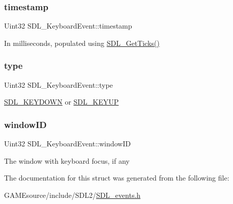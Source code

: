 \subsubsection{\texorpdfstring{timestamp}{timestamp}}
{\footnotesize\ttfamily Uint32 S\+D\+L\+\_\+\+Keyboard\+Event\+::timestamp}

In milliseconds, populated using \mbox{\hyperlink{_s_d_l__timer_8h_a0b9bc71d6287e0ffafdc3419760fe2b3}{S\+D\+L\+\_\+\+Get\+Ticks()}} \mbox{\label{struct_s_d_l___keyboard_event_ae0b2f2aace6f80c1f47e5a14350d409a}} 
\subsubsection{\texorpdfstring{type}{type}}
{\footnotesize\ttfamily Uint32 S\+D\+L\+\_\+\+Keyboard\+Event\+::type}

\mbox{\hyperlink{_s_d_l__events_8h_a3b589e89be6b35c02e0dd34a55f3fccaacaf8cfd53c985cdbf6a90c811d51a1fc}{S\+D\+L\+\_\+\+K\+E\+Y\+D\+O\+WN}} or \mbox{\hyperlink{_s_d_l__events_8h_a3b589e89be6b35c02e0dd34a55f3fccaadefb8866b9d28be21c2c33c35cc66c4b}{S\+D\+L\+\_\+\+K\+E\+Y\+UP}} \mbox{\label{struct_s_d_l___keyboard_event_a56efb6780b96acd5b50d8f797efb3546}} 
\subsubsection{\texorpdfstring{window\+ID}{windowID}}
{\footnotesize\ttfamily Uint32 S\+D\+L\+\_\+\+Keyboard\+Event\+::window\+ID}

The window with keyboard focus, if any 

The documentation for this struct was generated from the following file\+:\begin{DoxyCompactItemize}
\item 
G\+A\+M\+Esource/include/\+S\+D\+L2/\mbox{\hyperlink{_s_d_l__events_8h}{S\+D\+L\+\_\+events.\+h}}\end{DoxyCompactItemize}
